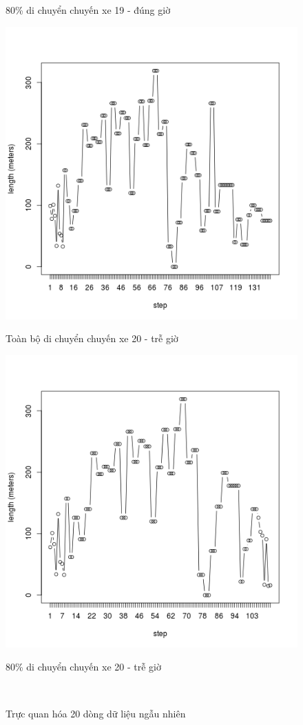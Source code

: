 \documentclass[a4paper, 13pt]{report}
\begin{document}
\begin{figure}[!htb]
  \caption*{80\% di chuyển chuyến xe 19 - đúng giờ}
\endminipage
{}%
  \includegraphics[width=\linewidth]{test_100_20}
  \caption*{Toàn bộ di chuyển chuyến xe 20 - trễ giờ}
\endminipage
{}
  \includegraphics[width=\linewidth]{test_80_20}
  \caption*{80\% di chuyển chuyến xe 20 - trễ giờ}
\endminipage\\
\caption*{Trực quan hóa 20 dòng dữ liệu ngẫu nhiên}
\end{figure}
\FloatBarrier
\end{document}
